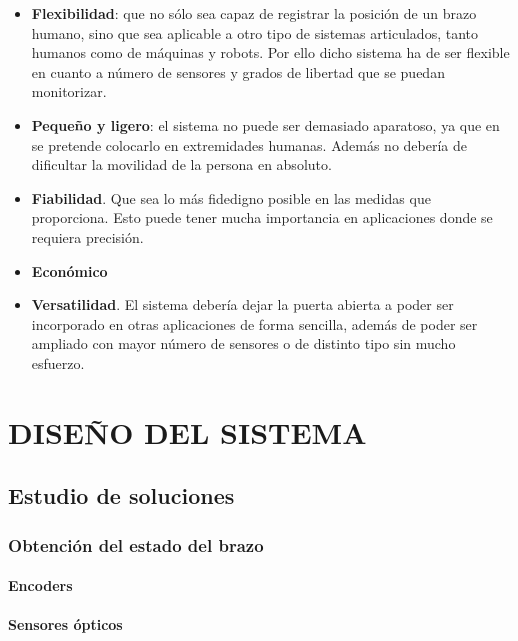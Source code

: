 \documentclass[12pt, a4paper]{report}
\begin{document}
\begin{itemize}

\item \textbf{Flexibilidad}: que no sólo sea capaz de registrar la posición de un brazo humano, sino que sea aplicable a otro tipo de sistemas articulados, tanto humanos como de máquinas y robots. Por ello dicho sistema ha de ser flexible en cuanto a número de sensores y grados de libertad que se puedan monitorizar.

\item \textbf{Pequeño y ligero}: el sistema no puede ser demasiado aparatoso, ya que en se pretende colocarlo en extremidades humanas. Además no debería de dificultar la movilidad de la persona en absoluto.

\item \textbf{Fiabilidad}. Que sea lo más fidedigno posible en las medidas que proporciona. Esto puede tener mucha importancia en aplicaciones donde se requiera precisión.

\item \textbf{Económico}

\item \textbf{Versatilidad}. El sistema debería dejar la puerta abierta a poder ser incorporado en otras aplicaciones de forma sencilla, además de poder ser ampliado con mayor número de sensores o de distinto tipo sin mucho esfuerzo. 

\end{itemize}


\chapter{DISEÑO DEL SISTEMA}

\section{Estudio de soluciones}

\subsection{Obtención del estado del brazo}

\subsubsection{Encoders}

\subsubsection{Sensores ópticos}
\end{document}
